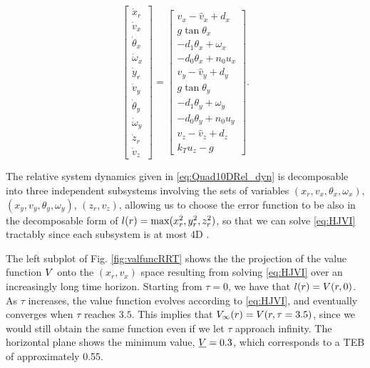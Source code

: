 \begin{equation}
\label{eq:Quad10DRel_dyn}
\begin{bmatrix}
\dot x_r\\
\dot v_x\\
\dot \theta_x\\
\dot\omega_x\\
\dot y_r\\
\dot v_y\\
\dot \theta_y\\
\dot\omega_y\\
\dot z_r\\
\dot v_z
\end{bmatrix} =
\begin{bmatrix}
v_x - \hat v_x + d_x\\
g \tan \theta_x\\
-d_1 \theta_x + \omega_x\\
-d_0 \theta_x + n_0 u_x\\
v_y - \hat v_y + d_y\\
g \tan \theta_y\\
-d_1 \theta_y + \omega_y\\
-d_0 \theta_y + n_0 u_y\\
v_z - \hat v_z + d_z\\
k_T u_z - g
\end{bmatrix}.
\end{equation}


The relative system dynamics given in \eqref{eq:Quad10DRel_dyn} is decomposable into three independent subsystems involving the sets of variables $(x_r, v_x, \theta_x, \omega_x)$, $(x_y, v_y, \theta_y, \omega_y)$, $(z_r, v_z)$, allowing us to choose the error function to be also in the decomposable form of $l(r) = \max(x_r^2, y_r^2, z_r^2)$, so that we can solve \eqref{eq:HJVI} tractably since each subsystem is at most 4D \cite{Chen2016DecouplingJournal}. 

The left subplot of Fig. \ref{fig:valfuncRRT} shows the the projection of the value function $V$ onto the $(x_r, v_x)$ space resulting from solving \eqref{eq:HJVI} over an increasingly long time horizon.
Starting from $\tau=0$, we have that $l(r) = V(r, 0)$.
As $\tau$ increases, the value function evolves according to \eqref{eq:HJVI}, and eventually converges when $\tau$ reaches $3.5$.
This implies that $V_\infty(r) = V(r, \tau=3.5)$, since we would still obtain the same function even if we let $\tau$ approach infinity.
The horizontal plane shows the minimum value, $\underline{V} = 0.3$, which corresponds to a TEB of approximately 0.55.

